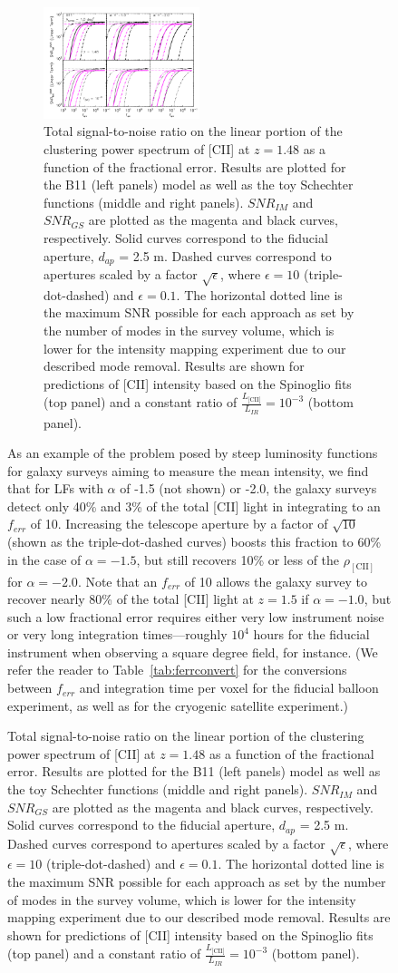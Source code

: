 \documentclass[iop,twocolappendix]{emulateapj}
\begin{document}
\begin{figure}[t]
\begin{figure}[h]
 \centering
 \includegraphics[width=0.5\textwidth]{snr_im_gs_ferr_nmodeIM_1d-1_1d3_b11_alpham1p0_alpham2p0_0p1vpix_vpix_10vpix_z148}
\caption{Total signal-to-noise ratio on the linear portion of the clustering power spectrum of [CII] at $z=1.48$ as a function of the fractional error. Results are plotted for the B11 (left panels) model as well as the toy Schechter functions (middle and right panels). $SNR_{IM}$ and $SNR_{GS}$ are plotted as the magenta and black curves, respectively. Solid curves correspond to the fiducial aperture, $d_{ap}$ = 2.5 m. Dashed curves correspond to apertures scaled by a factor $\sqrt{\epsilon}$, where $\epsilon=10$ (triple-dot-dashed) and $\epsilon=0.1$. The horizontal dotted line is the maximum SNR possible for each approach as set by the number of modes in the survey volume, which is lower for the intensity mapping experiment due to our described mode removal. Results are shown for predictions of [CII] intensity based on the Spinoglio fits (top panel) and a constant ratio of $\frac{L_{\textrm{[CII]}}}{L_{IR}} = 10^{-3}$ (bottom panel).}
\label{fig:snr_vs_ferr}
\end{figure}

As an example of the problem posed by steep luminosity functions for galaxy surveys aiming to measure the mean intensity, we find that for LFs with $\alpha$ of -1.5 (not shown) or -2.0, the galaxy surveys detect only 40\% and 3\% of the total [CII] light in integrating to an $f_{err}$ of 10. Increasing the telescope aperture by a factor of $\sqrt{10}$ (shown as the triple-dot-dashed curves) boosts this fraction to 60\% in the case of $\alpha = -1.5$, but still recovers 10\% or less of the $\rho_{\mathrm{[CII]}}$ for $\alpha = -2.0$. Note that an $f_{err}$ of 10 allows the galaxy survey to recover nearly 80\% of the total [CII] light at $z=1.5$ if $\alpha=-1.0$, but such a low fractional error requires either very low instrument noise or very long integration times---roughly $10^4$ hours for the fiducial instrument when observing a square degree field, for instance. (We refer the reader to Table~\ref{tab:ferrconvert} for the conversions between $f_{err}$ and integration time per voxel for the fiducial balloon experiment, as well as for the cryogenic satellite experiment.)
 

\end{figure}
\end{document}
